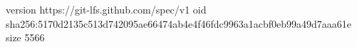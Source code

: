 version https://git-lfs.github.com/spec/v1
oid sha256:5170d2135c513d742095ae66474ab4e4f46fdc9963a1acbf0eb99a49d7aaa61e
size 5566

